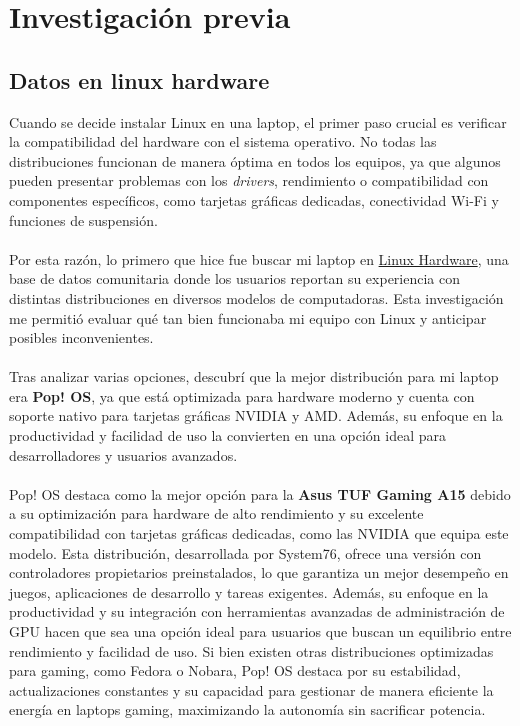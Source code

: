 \section{Investigación previa}

\subsection{Datos en linux hardware}

Cuando se decide instalar Linux en una laptop, el primer paso crucial es verificar la compatibilidad del hardware con el sistema operativo. No todas las distribuciones funcionan de manera óptima en todos los equipos, ya que algunos pueden presentar problemas con los \textit{drivers}, rendimiento o compatibilidad con componentes específicos, como tarjetas gráficas dedicadas, conectividad Wi-Fi y funciones de suspensión.
\\\\
Por esta razón, lo primero que hice fue buscar mi laptop en \href{https://linux-hardware.org/}{Linux Hardware}, una base de datos comunitaria donde los usuarios reportan su experiencia con distintas distribuciones en diversos modelos de computadoras. Esta investigación me permitió evaluar qué tan bien funcionaba mi equipo con Linux y anticipar posibles inconvenientes.
\\\\
Tras analizar varias opciones, descubrí que la mejor distribución para mi laptop era \textbf{Pop! OS}, ya que está optimizada para hardware moderno y cuenta con soporte nativo para tarjetas gráficas NVIDIA y AMD. Además, su enfoque en la productividad y facilidad de uso la convierten en una opción ideal para desarrolladores y usuarios avanzados.
\\\\
Pop! OS destaca como la mejor opción para la \textbf{Asus TUF Gaming A15} debido a su optimización para hardware de alto rendimiento y su excelente compatibilidad con tarjetas gráficas dedicadas, como las NVIDIA que equipa este modelo. Esta distribución, desarrollada por System76, ofrece una versión con controladores propietarios preinstalados, lo que garantiza un mejor desempeño en juegos, aplicaciones de desarrollo y tareas exigentes. Además, su enfoque en la productividad y su integración con herramientas avanzadas de administración de GPU hacen que sea una opción ideal para usuarios que buscan un equilibrio entre rendimiento y facilidad de uso. Si bien existen otras distribuciones optimizadas para gaming, como Fedora o Nobara, Pop! OS destaca por su estabilidad, actualizaciones constantes y su capacidad para gestionar de manera eficiente la energía en laptops gaming, maximizando la autonomía sin sacrificar potencia.
